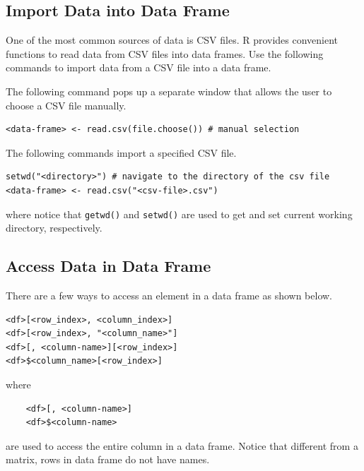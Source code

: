 \subsection{Import Data into Data Frame}

One of the most common sources of data is CSV files. R provides convenient functions to read data from CSV files into data frames. Use the following commands to import data from a CSV file into a data frame.

The following command pops up a separate window that allows the user to choose a CSV file manually.
\begin{lstlisting}
<data-frame> <- read.csv(file.choose()) # manual selection
\end{lstlisting}
The following commands import a specified CSV file.
\begin{lstlisting}
setwd("<directory>") # navigate to the directory of the csv file
<data-frame> <- read.csv("<csv-file>.csv")
\end{lstlisting}
where notice that \verb|getwd()| and \verb|setwd()| are used to get and set current working directory, respectively.

\subsection{Access Data in Data Frame}

There are a few ways to access an element in a data frame as shown below.
\begin{lstlisting}
<df>[<row_index>, <column_index>]
<df>[<row_index>, "<column_name>"]
<df>[, <column-name>][<row_index>]
<df>$<column_name>[<row_index>]
\end{lstlisting}
where
\begin{lstlisting}
	<df>[, <column-name>]
	<df>$<column-name>
\end{lstlisting}
are used to access the entire column in a data frame. Notice that different from a matrix, rows in data frame do not have names.

